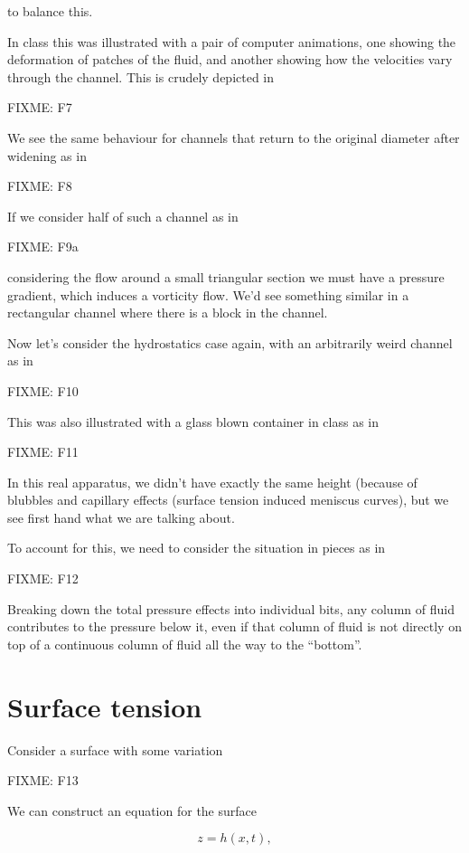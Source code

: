 to balance this.

In class this was illustrated with a pair of computer animations, one showing the deformation of patches of the fluid, and another showing how the velocities vary through the channel.  This is crudely depicted in 

FIXME: F7

We see the same behaviour for channels that return to the original diameter after widening as in

FIXME: F8

If we consider half of such a channel as in

FIXME: F9a

considering the flow around a small triangular section we must have a pressure gradient, which induces a vorticity flow.  We'd see something similar in a rectangular channel where there is a block in the channel.

Now let's consider the hydrostatics case again, with an arbitrarily weird channel as in

FIXME: F10

This was also illustrated with a glass blown container in class as in 

FIXME: F11

In this real apparatus, we didn't have exactly the same height (because of blubbles and capillary effects (surface tension induced meniscus curves), but we see first hand what we are talking about.

To account for this, we need to consider the situation in pieces as in

FIXME: F12

Breaking down the total pressure effects into individual bits, any column of fluid contributes to the pressure below it, even if that column of fluid is not directly on top of a continuous column of fluid all the way to the ``bottom''.

\section{Surface tension}

Consider a surface with some variation

FIXME: F13

We can construct an equation for the surface

\begin{equation}\label{eqn:continuumL13:n}
z = h(x, t),
\end{equation}


